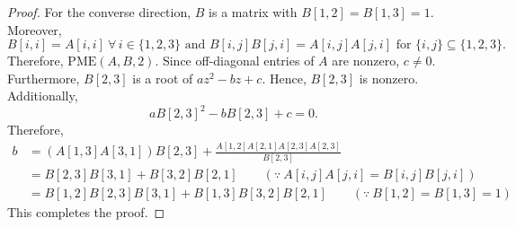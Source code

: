 \documentclass[11pt,letterpaper]{article}
\newcommand{\kPME}[3]{\mathrm{PME}(#1, #2, #3)}
\begin{document}
{{{\begin{proof}
For the converse direction, $B$ is a matrix with $B[1,2]=B[1,3]=1$. Moreover, $$B[i,i]=A[i,i] \ \forall\,i\in\{1,2,3\} \text{ and } B[i,j]B[j,i]=A[i,j]A[j,i] \text{ for }\{i,j\}\subseteq \{1,2,3\}.$$ Therefore, $\kPME{A}{B}{2}$. Since off-diagonal entries of $A$ are nonzero, $c\neq 0$. Furthermore, $B[2,3]$ is a root of $az^2-bz+c$. Hence, $B[2,3]$ is nonzero. Additionally, $$aB[2,3]^2-bB[2,3]+c = 0.$$ Therefore,
\begin{align*}
b&=\left(A[1,3]A[3,1]\right)B[2,3]+\frac{A[1,2]A[2,1]A[2,3]A[2,3]}{B[2,3]}\\
&=B[2,3]B[3,1]+B[3,2]B[2,1] \qquad (\because\  A[i,j]A[j,i]=B[i,j]B[j,i])\\
&=B[1,2]B[2,3]B[3,1]+B[1,3]B[3,2]B[2,1] \qquad (\because\ B[1,2]=B[1,3]=1)
\end{align*}
This completes the proof.
\end{proof}

}}}
\end{document}

